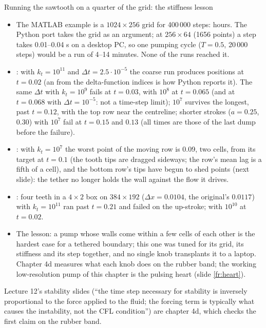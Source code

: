\documentclass[aspectratio=169,11pt]{beamer}
\begin{document}
\begin{frame}{Running the sawtooth on a quarter of the grid: the stiffness lesson}
\label{fr:sawrun}
\scriptsize\setlength{\itemsep}{1pt}
\begin{itemize}
  \item The MATLAB example is a $1024 \times 256$ grid for 400\,000 steps: hours. The Python port takes the grid as an argument; at $256 \times 64$ (1656 points) a step takes 0.01--0.04 s on a desktop PC, so one pumping cycle ($T = 0.5$, 20\,000 steps) would be a run of 4--14 minutes. None of the runs reached it.
  \item {}: with $k_t = 10^{11}$ and $\Delta t = 2.5 \cdot 10^{-5}$ the coarse run produces  positions at $t = 0.02$ (an  from the delta-function indices is how Python reports it). The same $\Delta t$ with $k_t = 10^9$ fails at $t = 0.03$, with $10^8$ at $t = 0.065$ (and at $t = 0.068$ with $\Delta t = 10^{-5}$: not a time-step limit); $10^7$ survives the longest, past $t = 0.12$, with the top row near the centreline; shorter strokes ($a = 0.25$, $0.30$) with $10^7$ fail at $t = 0.15$ and $0.13$ (all times are those of the last dump before the failure).
  \item {}: with $k_t = 10^7$ the worst point of the moving row is 0.09, two cells, from its target at $t = 0.1$ (the tooth tips are dragged sideways; the row's mean lag is a fifth of a cell), and the bottom row's tips have begun to shed points (next slide): the tether no longer holds the wall against the flow it drives.
  \item {}: four teeth in a $4 \times 2$ box on $384 \times 192$ ($\Delta x = 0.0104$, the original's $0.0117$) with $k_t = 10^{11}$ ran past $t = 0.21$ and failed on the up-stroke; with $10^{10}$ at $t = 0.02$.
  \item The lesson: a pump whose walls come within a few cells of each other is the hardest case for a tethered boundary; this one was tuned for its grid, its stiffness and its step together, and no single knob transplants it to a laptop. Chapter 4d measures what each knob does on the rubber band; the working low-resolution pump of this chapter is the pulsing heart (slide \ref{fr:heart}).
\end{itemize}
\vspace{-1.5mm}
\begin{punchbox}
\footnotesize Lecture 12's stability slides (``the time step necessary for stability is inversely proportional to the force applied to the fluid; the forcing term is typically what causes the instability, not the CFL condition'') are chapter 4d, which checks the first claim on the rubber band.
\end{punchbox}
\end{frame}
\end{document}
